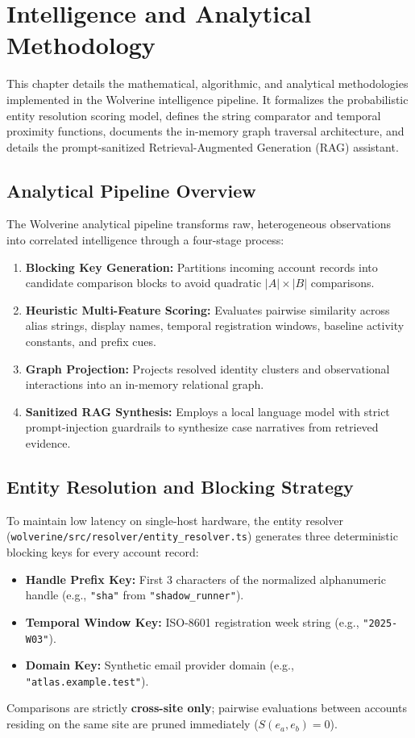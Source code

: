 \chapter{Intelligence and Analytical Methodology}
\label{ch:analytical-methodology}

This chapter details the mathematical, algorithmic, and analytical methodologies implemented in the Wolverine intelligence pipeline. It formalizes the probabilistic entity resolution scoring model, defines the string comparator and temporal proximity functions, documents the in-memory graph traversal architecture, and details the prompt-sanitized Retrieval-Augmented Generation (RAG) assistant.

\section{Analytical Pipeline Overview}
\label{sec:algo-pipeline}
The Wolverine analytical pipeline transforms raw, heterogeneous observations into correlated intelligence through a four-stage process:
\begin{enumerate}
    \item \textbf{Blocking Key Generation:} Partitions incoming account records into candidate comparison blocks to avoid quadratic $|A| \times |B|$ comparisons.
    \item \textbf{Heuristic Multi-Feature Scoring:} Evaluates pairwise similarity across alias strings, display names, temporal registration windows, baseline activity constants, and prefix cues.
    \item \textbf{Graph Projection:} Projects resolved identity clusters and observational interactions into an in-memory relational graph.
    \item \textbf{Sanitized RAG Synthesis:} Employs a local language model with strict prompt-injection guardrails to synthesize case narratives from retrieved evidence.
\end{enumerate}

\section{Entity Resolution and Blocking Strategy}
\label{sec:algo-entity-resolution}
To maintain low latency on single-host hardware, the entity resolver (\texttt{wolverine/src/resolver/entity\_resolver.ts}) generates three deterministic blocking keys for every account record:
\begin{itemize}
    \item \textbf{Handle Prefix Key:} First 3 characters of the normalized alphanumeric handle (e.g., \texttt{"sha"} from \texttt{"shadow\_runner"}).
    \item \textbf{Temporal Window Key:} ISO-8601 registration week string (e.g., \texttt{"2025-W03"}).
    \item \textbf{Domain Key:} Synthetic email provider domain (e.g., \texttt{"atlas.example.test"}).
\end{itemize}
Comparisons are strictly \textbf{cross-site only}; pairwise evaluations between accounts residing on the same site are pruned immediately ($S(e_a, e_b) = 0$).

